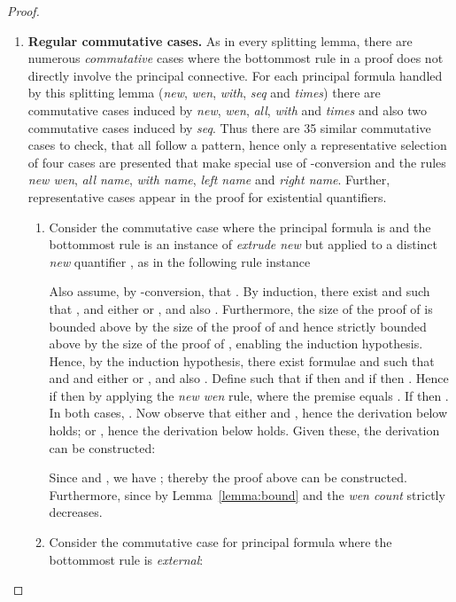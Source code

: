 \begin{proof}
\begin{enumerate}[label=\textbf{\Alph*},ref=\Alph*,leftmargin=*]
{}




 


\item \textbf{Regular commutative cases.} As in every splitting lemma, there are numerous \textit{commutative} cases where the bottommost rule in a proof does not directly involve the principal connective.
For each principal formula handled by this splitting lemma (\textit{new}, \textit{wen}, \textit{with}, \textit{seq} and \textit{times}) there are commutative cases induced by \textit{new}, \textit{wen}, \textit{all}, \textit{with} and \textit{times} and also two commutative cases induced by \textit{seq}.
Thus there are 35 similar commutative cases to check, that all follow a pattern, hence only a representative selection of four cases are presented that make special use of -conversion and the rules \textit{new wen},
\textit{all name}, \textit{with name}, \textit{left name} and \textit{right name}.
Further, representative cases appear in the proof for existential quantifiers.


\begin{enumerate}[label*=\textbf{.\arabic*}]

\item Consider the commutative case where the principal formula is  and the bottommost rule is an instance of \textit{extrude new} but applied to a distinct \textit{new} quantifier , as in the following rule instance 
 
Also assume, by -conversion, that .
By induction, there exist  and  such that ,  and either  or , and also
.
Furthermore, the size of the proof of  is bounded above by the size of the proof of  and hence strictly bounded above by the size of the proof of , enabling the induction hypothesis.
Hence, by the induction hypothesis, there exist formulae  and  such that  and  and either  or , and also .
Define  such that if  then  and if  then .
Hence if  then  by applying the \textit{new wen} rule, where the premise equals .
If  then . In both cases, .
Now observe that either  and , hence the derivation  below holds;
or , hence the derivation  below holds. Given these, the derivation  can be constructed:

Since  and , we have ;
thereby the proof  above can be constructed.
Furthermore,  since by Lemma~\ref{lemma:bound} 
and the \textit{wen count} strictly decreases.



\item Consider the commutative case for principal formula  where the bottommost rule is \textit{external}: 


\end{enumerate}
\end{enumerate}
\end{proof}
